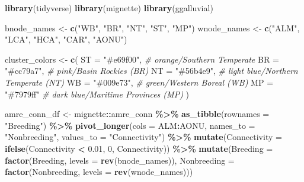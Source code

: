 \documentclass[
]{book}
\newenvironment{Shaded}{\begin{snugshade}}{\end{snugshade}}
\newcommand{\AttributeTok}[1]{\textcolor[rgb]{0.13,0.29,0.53}{#1}}
\newcommand{\CommentTok}[1]{\textcolor[rgb]{0.56,0.35,0.01}{\textit{#1}}}
\newcommand{\DecValTok}[1]{\textcolor[rgb]{0.00,0.00,0.81}{#1}}
\newcommand{\FloatTok}[1]{\textcolor[rgb]{0.00,0.00,0.81}{#1}}
\newcommand{\FunctionTok}[1]{\textcolor[rgb]{0.13,0.29,0.53}{\textbf{#1}}}
\newcommand{\NormalTok}[1]{#1}
\newcommand{\OtherTok}[1]{\textcolor[rgb]{0.56,0.35,0.01}{#1}}
\newcommand{\SpecialCharTok}[1]{\textcolor[rgb]{0.81,0.36,0.00}{\textbf{#1}}}
\newcommand{\StringTok}[1]{\textcolor[rgb]{0.31,0.60,0.02}{#1}}
\begin{document}
\begin{Shaded}
\begin{Highlighting}[]
\FunctionTok{library}\NormalTok{(tidyverse)}
\FunctionTok{library}\NormalTok{(mignette)}
\FunctionTok{library}\NormalTok{(ggalluvial)}

\NormalTok{bnode\_names }\OtherTok{\textless{}{-}} \FunctionTok{c}\NormalTok{(}\StringTok{"WB"}\NormalTok{, }\StringTok{"BR"}\NormalTok{, }\StringTok{"NT"}\NormalTok{, }\StringTok{"ST"}\NormalTok{, }\StringTok{"MP"}\NormalTok{)}
\NormalTok{wnode\_names }\OtherTok{\textless{}{-}} \FunctionTok{c}\NormalTok{(}\StringTok{"ALM"}\NormalTok{, }\StringTok{"LCA"}\NormalTok{, }\StringTok{"HCA"}\NormalTok{, }\StringTok{"CAR"}\NormalTok{, }\StringTok{"AONU"}\NormalTok{)}

\NormalTok{cluster\_colors }\OtherTok{\textless{}{-}}  \FunctionTok{c}\NormalTok{(}
  \StringTok{\textasciigrave{}}\AttributeTok{ST}\StringTok{\textasciigrave{}} \OtherTok{=} \StringTok{"\#e69f00"}\NormalTok{, }\CommentTok{\# orange/Southern Temperate}
  \StringTok{\textasciigrave{}}\AttributeTok{BR}\StringTok{\textasciigrave{}} \OtherTok{=} \StringTok{"\#cc79a7"}\NormalTok{, }\CommentTok{\# pink/Basin Rockies (BR)}
  \StringTok{\textasciigrave{}}\AttributeTok{NT}\StringTok{\textasciigrave{}} \OtherTok{=} \StringTok{"\#56b4e9"}\NormalTok{, }\CommentTok{\# light blue/Northern Temperate (NT)}
  \StringTok{\textasciigrave{}}\AttributeTok{WB}\StringTok{\textasciigrave{}} \OtherTok{=} \StringTok{"\#009e73"}\NormalTok{, }\CommentTok{\# green/Western Boreal (WB)}
  \StringTok{\textasciigrave{}}\AttributeTok{MP}\StringTok{\textasciigrave{}} \OtherTok{=} \StringTok{"\#7979ff"} \CommentTok{\# dark blue/Maritime Provinces (MP)}
\NormalTok{) }

\NormalTok{amre\_conn\_df }\OtherTok{\textless{}{-}}\NormalTok{ mignette}\SpecialCharTok{::}\NormalTok{amre\_conn }\SpecialCharTok{\%\textgreater{}\%}
  \FunctionTok{as\_tibble}\NormalTok{(}\AttributeTok{rownames =} \StringTok{"Breeding"}\NormalTok{) }\SpecialCharTok{\%\textgreater{}\%}
  \FunctionTok{pivot\_longer}\NormalTok{(}\AttributeTok{cols =}\NormalTok{ ALM}\SpecialCharTok{:}\NormalTok{AONU, }\AttributeTok{names\_to =} \StringTok{"Nonbreeding"}\NormalTok{, }\AttributeTok{values\_to =} \StringTok{"Connectivity"}\NormalTok{) }\SpecialCharTok{\%\textgreater{}\%}
  \FunctionTok{mutate}\NormalTok{(}\AttributeTok{Connectivity =} \FunctionTok{ifelse}\NormalTok{(Connectivity }\SpecialCharTok{\textless{}} \FloatTok{0.01}\NormalTok{, }\DecValTok{0}\NormalTok{, Connectivity)) }\SpecialCharTok{\%\textgreater{}\%}
  \FunctionTok{mutate}\NormalTok{(}\AttributeTok{Breeding =} \FunctionTok{factor}\NormalTok{(Breeding, }\AttributeTok{levels =} \FunctionTok{rev}\NormalTok{(bnode\_names)),}
         \AttributeTok{Nonbreeding =} \FunctionTok{factor}\NormalTok{(Nonbreeding, }\AttributeTok{levels =} \FunctionTok{rev}\NormalTok{(wnode\_names)))}


\end{Highlighting}
\end{Shaded}
\end{document}
